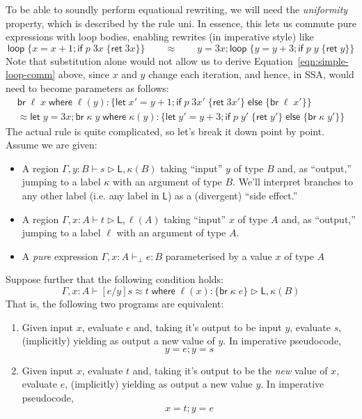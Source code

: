 \documentclass[acmsmall,screen,review]{acmart}
\newcommand{\ms}[1]{\ensuremath{\mathsf{#1}}}
\newcommand{\lto}{:}
\newcommand{\letstmt}[3]{\ensuremath{\ms{let}\;#1 = #2; #3}}
\newcommand{\brb}[2]{\ms{br}\;#1\;#2}
\newcommand{\where}[2]{#1\;\ms{where}\;#2}
\newcommand{\wbranch}[3]{#1(#2) \lto \{#3\}}
\newcommand{\bhyp}[2]{#1 : #2}
\newcommand{\hasty}[4]{#1 \vdash_{#2} #3: {#4}}
\newcommand{\haslb}[3]{#1 \vdash #2 \rhd #3}
\newcommand{\teqv}{\approx}
\newcommand{\lbeq}[4]{#1 \vdash #2 \teqv #3 \rhd {#4}}
\newcommand{\brle}[1]{{\textsf{#1}}}
\begin{document}
To be able to soundly perform equational rewriting, we will need the \emph{uniformity} property,
which is described by the rule \brle{uni}. In essence, this lets us commute pure expressions with
loop bodies, enabling rewrites (in imperative style) like
\begin{equation}
  \ms{loop}\;\{ x = x + 1; \ms{if}\;p\;3x\;\{\ms{ret}\;3x\} \}
  \qquad \teqv \qquad 
  y = 3x; \ms{loop}\;\{ y = y + 3; \ms{if}\;p\;y\;\{\ms{ret}\;y\} \}
  \label{eqn:simple-loop-comm} 
\end{equation}
Note that substitution alone would not allow us to derive Equation~\ref{eqn:simple-loop-comm} above,
since $x$ and $y$ change each iteration, and hence, in SSA, would need to become parameters as
follows:
\begin{multline}
  \where{\brb{\ell}{x}}{\wbranch{\ell}{y}
    {\letstmt{x'}{y + 1}{\ms{if}\;p\;3x'\;\{\ms{ret}\;3x'\}\;\ms{else}\;\{\brb{\ell}{x'}\}}}}
  \\ \teqv
  \where{\letstmt{y}{3x}{\brb{\kappa}{y}}}{\wbranch{\kappa}{y}
    {\letstmt{y'}{y + 3}{\ms{if}\;p\;y'\;\{\ms{ret}\;y'\}\;\ms{else}\;\{\brb{\kappa}{y'}\}}}}
  \label{eqn:loop-comm-ssa}
\end{multline}
The actual rule is quite complicated, so let's break it down point by point. Assume we are given:
\begin{itemize}
  \item A region $\haslb{\Gamma, \bhyp{y}{B}}{s}{\ms{L}, \kappa(B)}$ taking ``input'' $y$ of type
    $B$ and, as ``output,'' jumping to a label $\kappa$ with an argument of type $B$. We'll
    interpret branches to any other label (i.e. any label in $\ms{L}$) as a (divergent) ``side
    effect.''
  \item A region $\haslb{\Gamma, \bhyp{x}{A}}{t}{\ms{L}, \ell(A)}$ taking ``input'' $x$ of type
    $A$ and, as ``output,'' jumping to a label $\ell$ with an argument of type $A$.
  \item A \emph{pure} expression $\hasty{\Gamma, \bhyp{x}{A}}{\bot}{e}{B}$ parameterised by a value
    $x$ of type $A$
\end{itemize}
Suppose further that the following condition holds:
$$
  \lbeq{\Gamma, \bhyp{x}{A}}{[e/y]s}{\where{t}{\wbranch{\ell}{x}{\brb{\kappa}{e}}}}
    {\ms{L}, \kappa(B)}
$$
That is, the following two programs are equivalent:
\begin{enumerate}[label=(\alph*)]
  \item Given input $x$, evaluate $e$ and, taking it's output to be input $y$, evaluate $s$,
  (implicitly) yielding as output a new value of $y$. In imperative pseudocode,
  $$
    y = e; y = s
  $$
  \item Given input $x$, evaluate $t$ and, taking it's output to be the \emph{new} value of $x$,
  evaluate $e$, (implicitly) yielding as output a new value $y$. In imperative pseudocode,
  $$
    x = t; y = e
  $$
\end{enumerate}
\end{document}
